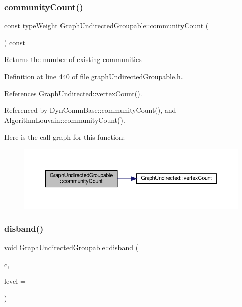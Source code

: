 \subsubsection{\texorpdfstring{community\+Count()}{communityCount()}}
{\footnotesize\ttfamily const \hyperlink{edge_8h_a2e7ea3be891ac8b52f749ec73fee6dd2}{type\+Weight} Graph\+Undirected\+Groupable\+::community\+Count (\begin{DoxyParamCaption}{ }\end{DoxyParamCaption}) const\hspace{0.3cm}{\ttfamily [inline]}}

\begin{DoxyReturn}{Returns}
the number of existing communities 
\end{DoxyReturn}


Definition at line 440 of file graph\+Undirected\+Groupable.\+h.



References Graph\+Undirected\+::vertex\+Count().



Referenced by Dyn\+Comm\+Base\+::community\+Count(), and Algorithm\+Louvain\+::community\+Count().

Here is the call graph for this function\+:
\nopagebreak
\begin{figure}[H]
\begin{center}
\leavevmode
\includegraphics[width=350pt]{classGraphUndirectedGroupable_adf6ebb83c3df6317f122a13650309ac4_cgraph}
\end{center}
\end{figure}
\mbox{\label{classGraphUndirectedGroupable_ac82f4c93994c372d05a660b36cdce8f3}} 
\subsubsection{\texorpdfstring{disband()}{disband()}}
{\footnotesize\ttfamily void Graph\+Undirected\+Groupable\+::disband (\begin{DoxyParamCaption}\item[{const \hyperlink{graphUndirectedGroupable_8h_a914da95c9ea7f14f4b7f875c36818556}{type\+Community} \&}]{c,  }\item[{const unsigned int \&}]{level = {} }\end{DoxyParamCaption})\hspace{0.3cm}{\ttfamily [inline]}}



